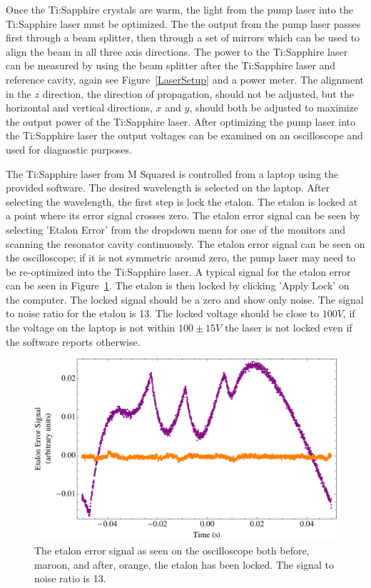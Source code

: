\documentclass[prb,preprint]{revtex4-1}
\begin{document}
Once the Ti:Sapphire crystals are warm, the light from the pump laser into the Ti:Sapphire laser must be optimized. The the output from the pump laser passes first through a beam splitter, then through a set of mirrors which can be used to align the beam in all three axis directions. The power to the Ti:Sapphire laser can be measured by using the beam splitter after the Ti:Sapphire laser and reference cavity, again see Figure~\ref{LaserSetup} and a power meter. The alignment in the $z$ direction, the direction of propagation, should not be adjusted, but the horizontal and vertical directions, $x$ and $y$, should both be adjusted to maximize the output power of the Ti:Sapphire laser. After optimizing the pump laser into the Ti:Sapphire laser the output voltages can be examined on an oscilloscope and used for diagnostic purposes. 

The Ti:Sapphire laser from M Squared is controlled from a laptop using the provided software. The desired wavelength is selected on the laptop. After selecting the wavelength, the first step is lock the etalon. The etalon is locked at a point where its error signal crosses zero. The etalon error signal can be seen by selecting 'Etalon Error' from the dropdown menu for one of the monitors and scanning the resonator cavity continuously. The etalon error signal can be seen on the oscilloscope; if it is not symmetric around zero, the pump laser may need to be re-optimized into the Ti:Sapphire laser. A typical signal for the etalon error can be seen in Figure~\ref{EtalonError}. The etalon is then locked by clicking 'Apply Lock' on the computer. The locked signal should be a zero and show only noise. The signal to noise ratio for the etalon is 13. The locked voltage should be close to $100 V$, if the voltage on the laptop is not within $100 \pm 15 V$ the laser is not locked even if the software reports otherwise.

\begin{figure}[h!]
\centering
\includegraphics[width=6in]{EtalonError.pdf}
\caption{The etalon error signal as seen on the oscilloscope both before, maroon, and after, orange, the etalon has been locked. The signal to noise ratio is 13.}
\label{EtalonError}
\end{figure}
\end{document}
